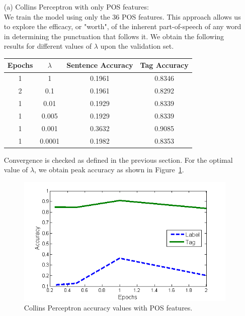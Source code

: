 \documentclass[11pt,a4paper,oneside]{article}
\begin{document}
\begin{itemize}

\item[(a)] Collins Perceptron with only POS features:\\

We train the model using only the 36 POS features. This approach allows us to explore the efficacy, or "worth", of the inherent part-of-speech of any word in determining the punctuation that follows it. We obtain the following results for different values of $\lambda$ upon the validation set.

\begin{center}
\begin{tabular}{|c|c|c|c|}
\hline
Epochs & $\lambda$ & Sentence Accuracy & Tag Accuracy\\\hline
1&	1	&	0.1961	&0.8346\\\hline
2&	0.1	&	0.1961	&0.8292\\\hline
1&	0.01&		0.1929	&0.8339\\\hline
1&	0.005&		0.1929	&0.8339\\\hline
1&	0.001	&	0.3632	&0.9085\\\hline
1&	0.0001&		0.1982	&0.8353\\\hline
\end{tabular}
\end{center}

Convergence is checked as defined in the previous section. For the optimal value of $\lambda$, we obtain peak accuracy as shown in Figure~\ref{fig:CP_oldFF}.

\begin{figure}[H]
\centering
\includegraphics[width=\columnwidth]{CP_oldFF}
\caption{Collins Perceptron accuracy values with POS features.}
\label{fig:CP_oldFF}
\end{figure}


\end{itemize}
\end{document}
